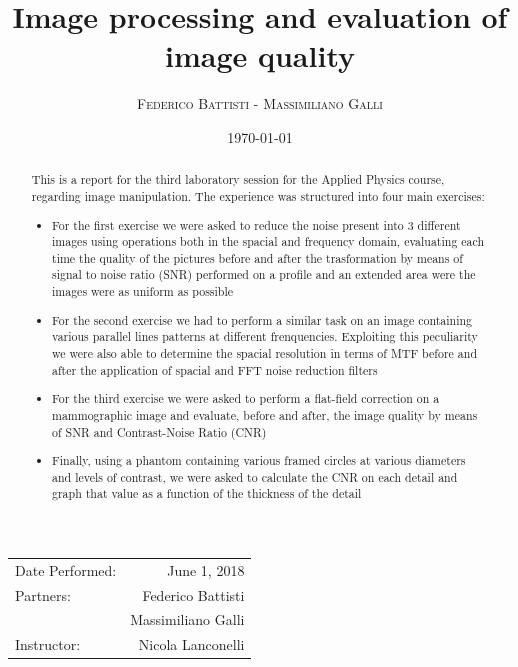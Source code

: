 \documentclass{article}
\title{Image processing and evaluation of image quality} %
\author{\textsc{Federico Battisti - Massimiliano Galli}} %
\date{\today} %
\begin{document}
\maketitle %

\begin{center}
\begin{tabular}{l r}
Date Performed: & June 1, 2018 \\ %
Partners: & Federico Battisti \\ %
& Massimiliano Galli \\
Instructor: & Nicola Lanconelli %
\end{tabular}
\end{center}
\begin{abstract}

	This is a report for the third laboratory session for the Applied Physics course, regarding image manipulation. The experience was structured into four main exercises: 
	\begin{itemize}
		\item For the first exercise we were asked to reduce the noise present into 3 different images using operations both in the spacial and frequency domain, evaluating each time the quality of the pictures before and after the trasformation by means of signal to noise ratio (SNR) performed on a profile and an extended area were the images were as uniform as possible
		\item For the second exercise we had to perform a similar task on an image containing various parallel lines patterns at different frenquencies. Exploiting this peculiarity we were also able to determine the spacial resolution in terms of MTF before and after the application of spacial and FFT noise reduction filters
		\item For the third exercise we were asked to perform a flat-field correction on a mammographic image and evaluate, before and after, the image quality by means of SNR and Contrast-Noise Ratio (CNR)
		\item Finally, using a phantom containing various framed circles at various diameters and levels of contrast, we were asked to calculate the CNR on each detail and graph that value as a function of the thickness of the detail 
		
	\end{itemize}
\end{abstract}
\clearpage 
\end{document}

